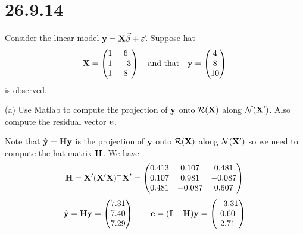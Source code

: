 \section*{26.9.14}
Consider the linear model ${\bf y}={\bf X}\vec\beta+\vec\varepsilon$.
Suppose hat
$${\bf X}=\left(\begin{matrix}
1 & 6\cr
1 & -3\cr
1 & 8
\end{matrix}\right)\quad\hbox{and that}\quad
{\bf y}=\left(\begin{matrix}
4\cr
8\cr
10
\end{matrix}\right)
$$
is observed.

\bigskip
\noindent
(a) Use Matlab to compute the projection of $\bf y$ onto
${\cal R}({\bf X})$ along ${\cal N}({\bf X}')$.
Also compute the residual vector $\bf e$.

\bigskip
\noindent
Note that $\hat{\mathbf y}=\bf Hy$ is the projection of
$\bf y$ onto ${\cal R}({\bf X})$ along ${\cal N}({\bf X}')$
so we need to compute the hat matrix $\bf H$.
We have
$${\bf H}={\bf X}'({\bf X}'{\bf X})^{-{}}{\bf X}'=\left(\begin{matrix}
0.413 & 0.107 & 0.481\cr
0.107 & 0.981 & -0.087\cr
0.481 & -0.087 & 0.607
\end{matrix}\right)
$$
$$\hat{\bf y}={\bf Hy}=\left(\begin{matrix}
7.31\cr
7.40\cr
7.29
\end{matrix}\right)\qquad
{\bf e}=({\bf I}-{\bf H}){\bf y}=\left(\begin{matrix}
-3.31\cr
0.60\cr
2.71
\end{matrix}\right)
$$

